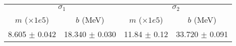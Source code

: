 \begin{tabular}{cc|cc}
\multicolumn{2}{c|}{$\sigma_1$} & \multicolumn{2}{|c}{$\sigma_2$} \\
$m$ ($\times1e5$) & $b$ (MeV) & $m$ ($\times1e5$) & $b$ (MeV) \\
\hline
8.605 $\pm$ 0.042 & 18.340 $\pm$ 0.030 & 11.84 $\pm$ 0.12 & 33.720 $\pm$ 0.091\\
\end{tabular}
